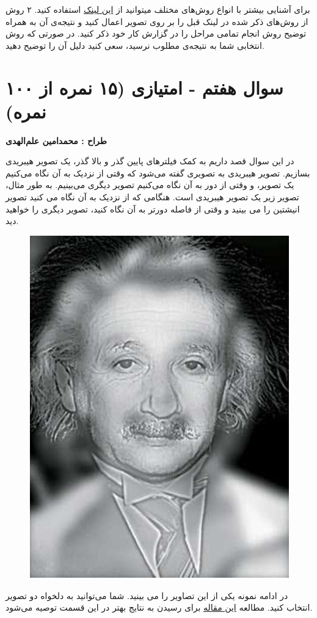 \documentclass[a4paper]{article}
\begin{document}
برای آشنایی بیشتر با انواع روش‌های مختلف
میتوانید از 
\href{https://docs.adaptive-vision.com/4.7/studio/machine_vision_guide/TemplateMatching.html}{این لینک}
استفاده کنید. ۲ روش از روش‌های ذکر شده در لینک قبل را بر روی تصویر اعمال کنید و نتیجه‌ی آن به همراه توضیح روش انجام تمامی مراحل را در گزارش کار خود ذکر کنید. در صورتی که روش‌ انتخابی شما به نتیجه‌ی مطلوب نرسید، سعی کنید دلیل آن را توضیح دهید.
\section*{ سوال هفتم - امتیازی (۱۵ نمره از ۱۰۰ نمره)}
\textbf{طراح :‌ محمدامین علم‌الهدی }
\vspace{0.3cm}

در این سوال قصد داریم به کمک فیلترهای پایین گذر و بالا گذر، یک تصویر هیبریدی بسازیم. تصویر هیبریدی به تصویری گفته می‌شود که وقتی از نزدیک به آن نگاه می‌کنیم یک تصویر، و وقتی از دور به آن نگاه می‌کنیم تصویر دیگری می‌بینیم. به طور مثال، تصویر زیر یک تصویر هیبریدی است. هنگامی که از نزدیک به آن نگاه می کنید تصویر انیشتین را می بینید و وقتی از فاصله دورتر به آن نگاه کنید، تصویر دیگری را خواهید دید.
\begin{figure}[h]
	\centering
	\includegraphics[width=0.3 \linewidth]{images/Picture9.png}
\end{figure}
در ادامه نمونه یکی از این تصاویر را می بینید. شما می‌توانید به دلخواه دو تصویر انتخاب کنید. مطالعه \href{https://stanford.edu/class/ee367/reading/OlivaTorralb_Hybrid_Siggraph06.pdf}{این مقاله}
برای رسیدن به نتایج بهتر در این قسمت توصیه می‌شود.
\end{document}
